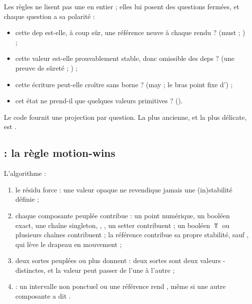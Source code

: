Les règles ne lisent pas une  en entier ; elles lui posent
des questions fermées, et chaque question a sa polarité :
\begin{itemize}
  \item \og cette dep est-elle, à coup sûr, une référence neuve à chaque
    rendu ?\fg{} (must ; ) ;
  \item \og cette valeur est-elle prouvablement stable, donc omissible des
    deps ?\fg{} (une preuve de sûreté ; ) ;
  \item \og cette écriture peut-elle croître sans borne ?\fg{} (may ; le bras
    point fixe d') ;
  \item \og cet état ne prend-il que quelques valeurs primitives ?\fg{}
    ().
\end{itemize}
Le code fournit une projection par question. La plus ancienne, et la plus
délicate, est .

\subsection{ : la règle \og motion-wins\fg{}}


L'algorithme :
\begin{enumerate}
  \item le résidu  force  : une valeur opaque ne
    revendique jamais une (in)stabilité définie ;
  \item chaque composante peuplée contribue : un point numérique, un booléen
    exact, une chaîne singleton, , , un setter
    contribuent  ; un booléen $\Top$ ou plusieurs chaînes
    contribuent  ; la référence contribue sa propre stabilité,
    sauf , qui lève le drapeau \og en mouvement\fg{} ;
  \item deux sortes peuplées ou plus donnent  : deux sortes
    sont deux valeurs -distinctes, et la valeur peut passer
    de l'une à l'autre ;
  \item {} : un intervalle non ponctuel ou une référence
     rend , même si une autre composante a
    dit .
\end{enumerate}


